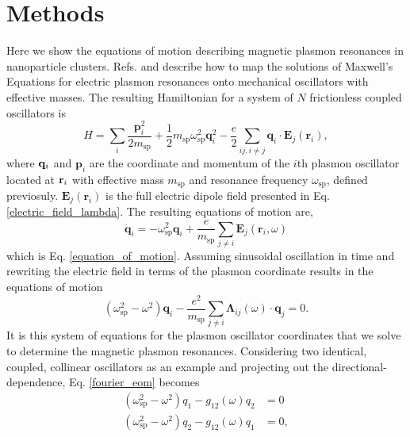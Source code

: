 \documentclass[journal=apchd5,manuscript=article]{achemso}
\begin{document}
\section{Methods}
Here we show the equations of motion describing magnetic plasmon resonances in nanoparticle clusters. Refs. \cite{Cherqui2014} and \cite{ARPC} describe how to map the solutions of Maxwell's Equations for electric plasmon resonances onto mechanical oscillators with effective masses. The resulting Hamiltonian for a system of $N$ frictionless coupled oscillators is
\begin{equation}
H = \sum_{i}\frac{\textbf{p}_i^2}{2m_{\textrm{sp}}}+\frac{1}{2}m_{\textrm{sp}}\omega_{\textrm{sp}}^2\textbf{q}_i^2 - \frac{e}{2}\sum_{ij,i\neq j}\textbf{q}_i\cdot\textbf{E}_j(\textbf{r}_i),
\label{hammy}
\end{equation}
where ${\bf q}_i$ and $\textbf{p}_i$ are the coordinate and momentum of the $i$th plasmon oscillator located at ${\bf r}_i$ with effective mass $m_{\textrm{sp}}$ and resonance frequency $\omega_{\textrm{sp}}$, defined previosuly. $\textbf{E}_j(\textbf{r}_i)$ is the full electric dipole field presented in Eq. \ref{electric_field_lambda}. The resulting equations of motion are,
\begin{equation}
\ddot{\textbf{q}}_i = -\omega_{\textrm{sp}}^2\textbf{q}_i + \frac{e}{m_{\textrm{sp}}}\sum_{j\neq i}\textbf{E}_j(\textbf{r}_i,\omega)
\label{equation_of_motion_again}
\end{equation}
which is Eq. \ref{equation_of_motion}. Assuming sinusoidal oscillation in time and rewriting the electric field in terms of the plasmon coordinate results in the equations of motion
\begin{equation}
(\omega_{\textrm{sp}}^2-\omega^2)\textbf{q}_i -\frac{e^2}{m_\textrm{sp}}\sum_{j\neq i}\boldsymbol{\Lambda}_{ij}(\omega)\cdot\textbf{q}_j = 0.
\label{fourier_eom}
\end{equation}
It is this system of equations for the plasmon oscillator coordinates that we solve to determine the magnetic plasmon resonances. Considering two identical, coupled, collinear oscillators as an example and projecting out the directional-dependence, Eq. \ref{fourier_eom} becomes
\begin{equation}
\begin{split}
(\omega_{\textrm{sp}}^2-\omega^2)q_1 -g_{12}(\omega)q_2 &= 0\\
(\omega_{\textrm{sp}}^2-\omega^2)q_2 -g_{12}(\omega)q_1 &= 0,
\label{fourier_eom_12}
\end{split}
\end{equation}
\end{document}
